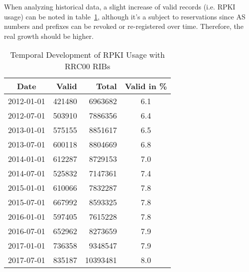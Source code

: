 When analyzing historical data, a slight increase of valid records (i.e.
RPKI usage) can be noted in table~\ref{tab:hist}, although it's a
subject to reservations since AS numbers and prefixes can be revoked or
re-registered over time. Therefore, the real growth should be higher.

\begin{table}
  \caption{Temporal Development of RPKI Usage with RRC00 RIBs}
  \label{tab:hist}
  \begin{tabular}{c|rr|c}
  \toprule
  Date&Valid&Total&Valid in \%\\
  \midrule
  2012-01-01&\num{421480}&\num{6963682}&6.1\\
  2012-07-01&\num{503910}&\num{7886356}&6.4\\
  2013-01-01&\num{575155}&\num{8851617}&6.5\\
  2013-07-01&\num{600118}&\num{8804669}&6.8\\
  2014-01-01&\num{612287}&\num{8729153}&7.0\\
  2014-07-01&\num{525832}&\num{7147361}&7.4\\
  2015-01-01&\num{610066}&\num{7832287}&7.8\\
  2015-07-01&\num{667992}&\num{8593325}&7.8\\
  2016-01-01&\num{597405}&\num{7615228}&7.8\\
  2016-07-01&\num{652962}&\num{8273659}&7.9\\
  2017-01-01&\num{736358}&\num{9348547}&7.9\\
  2017-07-01&\num{835187}&\num{10393481}&8.0\\
  \bottomrule
  \end{tabular}
\end{table}


